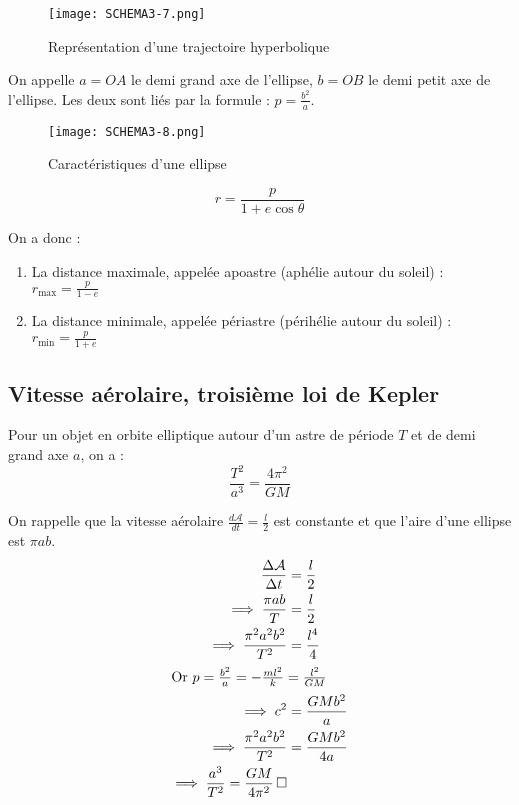 \begin{figure}[!htb]
    \centering
    \texttt{[image: SCHEMA3-7.png]}
    \caption{Représentation d'une trajectoire hyperbolique}
    \label{fig:SCHEMA3-7}
\end{figure}



\begin{definition}
    On appelle \(a = OA\) le demi grand axe de l'ellipse, \(b =OB\) le demi petit axe de l'ellipse. Les deux sont liés par la formule : \(p = \frac{b^{2}}{a}\).  
\end{definition}

\begin{figure}[!htb]
    \centering
    \texttt{[image: SCHEMA3-8.png]}
    \caption{Caractéristiques d'une ellipse}
    \label{fig:SCHEMA3-8}
\end{figure}


\[
    r = \frac{p}{1+e\cos \theta}
\]

\begin{corollary}
    On a donc : 
    \begin{enumerate}
        \item La distance maximale, appelée apoastre (aphélie autour du soleil) : \(r_{\max } = \frac{p}{1-e}\)
        \item La distance minimale, appelée périastre (périhélie autour du soleil) : \(r_{\min} = \frac{p}{1+e}\) 
    \end{enumerate}
\end{corollary}

\subsection{Vitesse aérolaire, troisième loi de Kepler}

\begin{theorem}
    Pour un objet en orbite elliptique autour d'un astre de période \(T\) et de demi grand axe \(a\), on a : 
    \[
        \frac{T^{2}}{a^{3}} = \frac{4\pi^{2}}{GM}
    \]
\end{theorem}
\newpage
\begin{explanation}
    On rappelle que la vitesse aérolaire \(\frac{d \mathcal{A}}{dt} = \frac{l}{2}\) est constante et que l'aire d'une ellipse est \(\pi ab\).
    \begin{align*}
        \frac{\Delta \mathcal{A}}{\Delta t} &= \frac{l}{2} \\
        \implies \frac{\pi ab}{T} &= \frac{l}{2} \\
        \implies \frac{\pi^{2}a^{2}b^{2}}{T^{2}} &= \frac{l^{4}}{4}\\
        \intertext{Or \(p = \frac{b^{2}}{a} = -\frac{ml^{2}}{k} = \frac{l^{2}}{GM}\) }
        \implies c^{2} &= \frac{GMb^{2}}{a}\\
        \implies \frac{\pi^{2}a^{2}b^{2}}{T^{2}} &= \frac{GMb^{2}}{4a}\\
        \implies \frac{a^{3}}{T^{2}} = \frac{GM}{4\pi^{2}} \,\square 
    \end{align*}
\end{explanation}